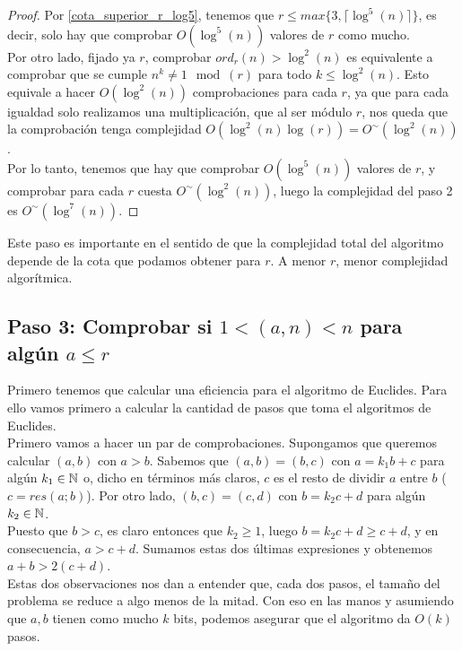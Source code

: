 \begin{proof}
	Por \autoref{cota_superior_r_log5}, tenemos que $r \leq max\{3, \lceil \log^5(n) \rceil \}$, es decir, solo hay que comprobar $O(\log^5(n))$ valores de $r$ como mucho.\\
	
	Por otro lado, fijado ya $r$, comprobar $ord_r(n) > \log^2(n)$ es equivalente a comprobar que se cumple $n^k \neq 1 \mod(r)$ para todo $k \leq \log^2(n)$. Esto equivale a hacer $O(\log^2(n))$ comprobaciones para cada $r$, ya que para cada igualdad solo realizamos una multiplicación, que al ser módulo $r$, nos queda que la comprobación tenga complejidad $O(\log^2(n)\log(r)) = O^\sim(\log^2(n))$.\\
	
	Por lo tanto, tenemos que hay que comprobar $O(\log^5(n))$ valores de $r$, y comprobar para cada $r$ cuesta $O^\sim(\log^2(n))$, luego la complejidad del paso 2 es $O^\sim(\log^7(n))$.
\end{proof}

Este paso es importante en el sentido de que la complejidad total del algoritmo depende de la cota que podamos obtener para $r$. A menor $r$, menor complejidad algorítmica.

\subsection{Paso 3: Comprobar si $1 < (a, n) < n$ para algún $a \leq r$}

Primero tenemos que calcular una eficiencia para el algoritmo de Euclides. Para ello vamos primero a calcular la cantidad de pasos que toma el algoritmos de Euclides.\\

Primero vamos a hacer un par de comprobaciones. Supongamos que queremos calcular $(a, b)$ con $a > b$. Sabemos que $(a, b) = (b, c)$ con $a = k_1b + c$ para algún $k_1 \in \mathbb{N}$ o, dicho en términos más claros, $c$ es el resto de dividir $a$ entre $b$ ($c = res(a; b)$). Por otro lado, $(b, c) = (c, d)$ con $b = k_2c + d$ para algún $k_2 \in \mathbb{N}$.\\

Puesto que $b > c$, es claro entonces que $k_2 \geq 1$, luego $b = k_2c + d \geq c + d$, y en consecuencia, $a > c + d$. Sumamos estas dos últimas expresiones y obtenemos $a + b > 2(c + d)$.\\

Estas dos observaciones nos dan a entender que, cada dos pasos, el tamaño del problema se reduce a algo menos de la mitad. Con eso en las manos y asumiendo que $a, b$ tienen como mucho $k$ bits, podemos asegurar que el algoritmo da $O(k)$ pasos.\\

